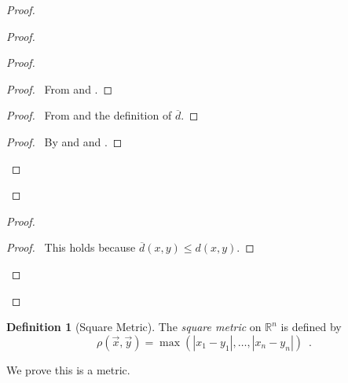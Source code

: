 \documentclass{report}
\let\qed\relax
\theoremstyle{definition}
\newtheorem{df}[lm]{Definition}
\begin{document}
  \begin{proof}
    \pf
    \begin{proof}
      \begin{proof}
        \begin{proof}
          \pf\ From  and .
        \end{proof}
        \begin{proof}
          \pf\ From  and the definition of $\overline{d}$.
        \end{proof}
        \begin{proof}
          \pf\ By  and  and .
        \end{proof}
      \end{proof}
    \end{proof}
    \begin{proof}
      \begin{proof}
        \pf\ This holds because $\overline{d}(x, y) \leq d(x, y)$.
      \end{proof}
    \end{proof}
    \qed
  \end{proof}

  \begin{df}[Square Metric]
    The \emph{square metric} on $\mathbb{R}^n$ is defined by
    \[ \rho(\vec{x}, \vec{y}) = \max(|x_1 - y_1|, \ldots, |x_n - y_n|) \enspace
    . \]

    We prove this is a metric.
  \end{df}
\end{document}
